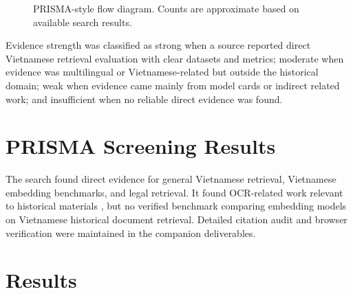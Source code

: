 \documentclass[11pt]{article}
\begin{document}
\begin{figure}[H]
\centering
{}
\caption{PRISMA-style flow diagram. Counts are approximate based on available search results.}
\label{fig:prisma}
\end{figure}

Evidence strength was classified as strong when a source reported direct Vietnamese retrieval evaluation with clear datasets and metrics; moderate when evidence was multilingual or Vietnamese-related but outside the historical domain; weak when evidence came mainly from model cards or indirect related work; and insufficient when no reliable direct evidence was found.

\section{PRISMA Screening Results}
The search found direct evidence for general Vietnamese retrieval, Vietnamese embedding benchmarks, and legal retrieval. It found OCR-related work relevant to historical materials \cite{nguyen-thiet-2025-sinovietnamese-ocr,zhang-etal-2024-ocr-hinders-rag}, but no verified benchmark comparing embedding models on Vietnamese historical document retrieval. Detailed citation audit and browser verification were maintained in the companion deliverables.

\section{Results}
\end{document}
